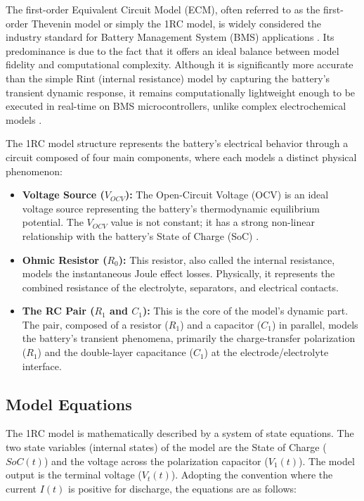 \documentclass[]{article}
\begin{document}
The first-order Equivalent Circuit Model (ECM), often referred to as the first-order Thevenin model or simply the 1RC model, is widely considered the industry standard for Battery Management System (BMS) applications \cite{tekin2024comparative}. Its predominance is due to the fact that it offers an ideal balance between model fidelity and computational complexity. Although it is significantly more accurate than the simple Rint (internal resistance) model by capturing the battery's transient dynamic response, it remains computationally lightweight enough to be executed in real-time on BMS microcontrollers, unlike complex electrochemical models \cite{mawuntu2023modeling}.

The 1RC model structure represents the battery's electrical behavior through a circuit composed of four main components, where each models a distinct physical phenomenon:
\begin{itemize}
	\item \textbf{Voltage Source ($V_{OCV}$):} The Open-Circuit Voltage (OCV) is an ideal voltage source representing the battery's thermodynamic equilibrium potential. The $V_{OCV}$ value is not constant; it has a strong non-linear relationship with the battery's State of Charge (SoC) \cite{tran2021comprehensive}.
	
	\item \textbf{Ohmic Resistor ($R_0$):} This resistor, also called the internal resistance, models the instantaneous Joule effect losses. Physically, it represents the combined resistance of the electrolyte, separators, and electrical contacts.
	
	\item \textbf{The RC Pair ($R_1$ and $C_1$):} This is the core of the model's dynamic part. The pair, composed of a resistor ($R_1$) and a capacitor ($C_1$) in parallel, models the battery's transient phenomena, primarily the charge-transfer polarization ($R_1$) and the double-layer capacitance ($C_1$) at the electrode/electrolyte interface.
\end{itemize}

\subsection{Model Equations}

The 1RC model is mathematically described by a system of state equations. The two state variables (internal states) of the model are the State of Charge ($SoC(t)$) and the voltage across the polarization capacitor ($V_1(t)$). The model output is the terminal voltage ($V_t(t)$). Adopting the convention where the current $I(t)$ is positive for discharge, the equations are as follows:
\end{document}
